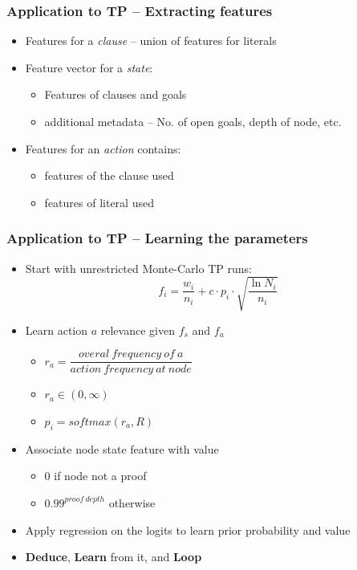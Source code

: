 \documentclass{beamer}
\begin{document}
\begin{frame}
    \frametitle{Application to TP -- Extracting features}
    \begin{itemize}
        \item Features for a \emph{clause} -- union of features for literals
        \pause
        \item Feature vector for a \emph{state}:
            \begin{itemize}
                \item Features of clauses and goals
                \item additional metadata -- No. of open goals, depth of node, etc.
            \end{itemize}
        \pause
        \item Features for an \emph{action} contains:
            \begin{itemize}
                \item features of the clause used
                \item features of literal used
            \end{itemize}
    \end{itemize}
\end{frame}

\begin{frame}
    \frametitle{Application to TP -- Learning the parameters}
    \begin{itemize}
        \item Start with unrestricted Monte-Carlo TP runs:
        \begin{equation*}
            f_i=\frac{w_i}{n_i}+c\cdot p_i \cdot \sqrt{\frac{\ln N_i}{n_i}}
        \end{equation*}
        \item<2-> Learn action $a$ relevance given $f_s$ and $f_a$
            \begin{itemize}
                \item $r_a=\dfrac{overal\ frequency\ of\ a}{action\ frequency\ at\ node}$ 
                \item $r_a \in (0, \infty)$
                \item $p_i=softmax(r_a, R)$ 
            \end{itemize}
        \item<3-> Associate node state feature with value
            \begin{itemize}
                \item 0 if node not a proof
                \item $0.99^{proof\ depth}$ otherwise
            \end{itemize}
        \item<4-> Apply regression on the logits to learn prior probability and value
        \item<4-> \textbf{Deduce}, \textbf{Learn} from it, and \textbf{Loop}
    \end{itemize}
\end{frame}
\end{document}
